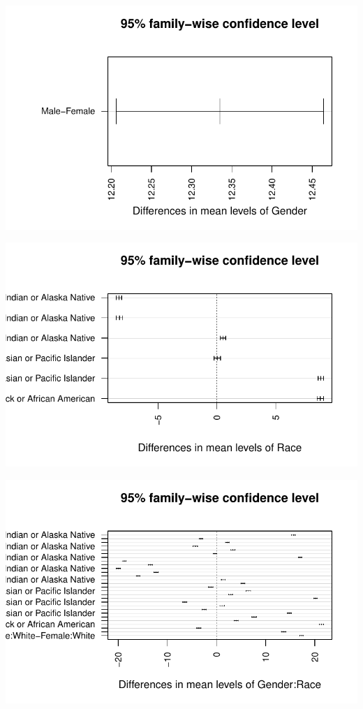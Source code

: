 \documentclass[
  letterpaper,
  DIV=11,
  numbers=noendperiod]{scrartcl}
\begin{document}
\includegraphics{Sec4_Team10_files/figure-pdf/unnamed-chunk-11-1.pdf}

\includegraphics{Sec4_Team10_files/figure-pdf/unnamed-chunk-11-2.pdf}

\includegraphics{Sec4_Team10_files/figure-pdf/unnamed-chunk-11-3.pdf}
\end{document}
